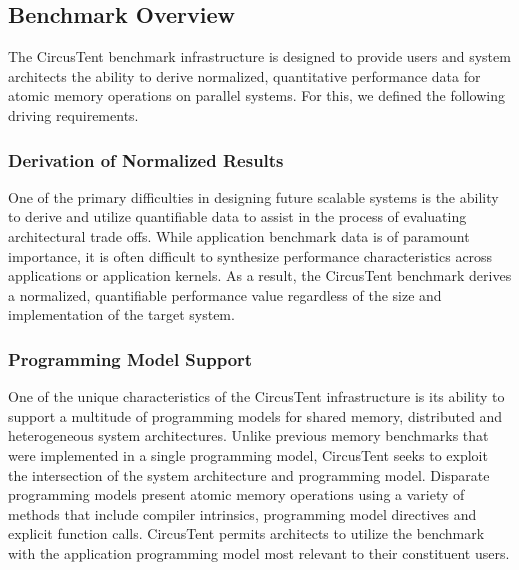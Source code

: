 

\subsection{Benchmark Overview}
\label{subsec:benchmark_overview}

The CircusTent benchmark infrastructure is designed to provide users and system 
architects the ability to derive normalized, quantitative performance data for 
atomic memory operations on parallel systems.  For this, we defined the following 
driving requirements.  

\subsubsection*{Derivation of Normalized Results} One of the primary difficulties in designing future scalable systems is the ability to derive and utilize quantifiable data 
to assist in the process of evaluating architectural trade offs.  While application benchmark data is of paramount importance, it is often difficult to synthesize performance characteristics across applications or application kernels.  As a result, the CircusTent benchmark derives a normalized, quantifiable performance value regardless of the size and implementation of the target system.  

\subsubsection*{Programming Model Support} One of the unique characteristics of the CircusTent infrastructure is its ability to support a multitude of programming models for shared memory, distributed and heterogeneous system architectures.  Unlike previous memory benchmarks that were implemented in a single programming model, CircusTent seeks to exploit the intersection of the system architecture and programming model.  Disparate programming models present atomic memory operations using a variety of methods that include compiler intrinsics, programming model directives and explicit function calls.  CircusTent permits architects to utilize the benchmark with the application programming model most relevant to their constituent users. 

